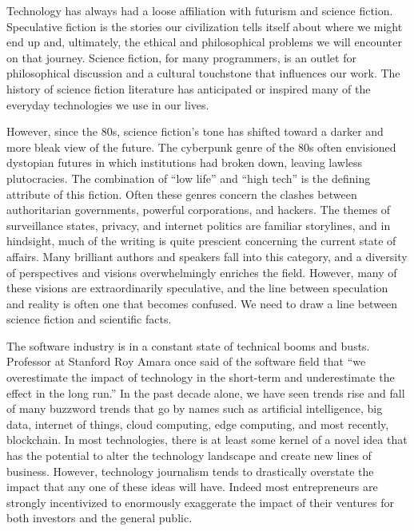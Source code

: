 Technology has always had a loose affiliation with futurism and science fiction.
Speculative fiction is the stories our civilization tells itself about where we
might end up and, ultimately, the ethical and philosophical problems we will
encounter on that journey. Science fiction, for many programmers, is an outlet
for philosophical discussion and a cultural touchstone that influences our work.
The history of science fiction literature has anticipated or inspired many of
the everyday technologies we use in our lives.

However, since the 80s, science fiction's tone has shifted toward a darker and
more bleak view of the future. The cyberpunk genre of the 80s often envisioned
dystopian futures in which institutions had broken down, leaving lawless
plutocracies. The combination of ``low life'' and ``high tech'' is the defining
attribute of this fiction. Often these genres concern the clashes between
authoritarian governments, powerful corporations, and hackers. The themes of
surveillance states, privacy, and internet politics are familiar storylines, and
in hindsight, much of the writing is quite prescient concerning the current
state of affairs. Many brilliant authors and speakers fall into this category,
and a diversity of perspectives and visions overwhelmingly enriches the field.
However, many of these visions are extraordinarily speculative, and the line
between speculation and reality is often one that becomes confused. We need to
draw a line between science fiction and scientific facts.


The software industry is in a constant state of technical booms and busts.
Professor at Stanford Roy Amara once said of the software field that ``we
overestimate the impact of technology in the short-term and underestimate the
effect in the long run.'' In the past decade alone, we have seen trends rise and
fall of many buzzword trends that go by names such as artificial intelligence,
big data, internet of things, cloud computing, edge computing, and most
recently, blockchain. In most technologies, there is at least some kernel of a
novel idea that has the potential to alter the technology landscape and create
new lines of business. However, technology journalism tends to drastically
overstate the impact that any one of these ideas will have. Indeed most
entrepreneurs are strongly incentivized to enormously exaggerate the impact of
their ventures for both investors and the general public.
\cite{white_blockchain-based_2022}


